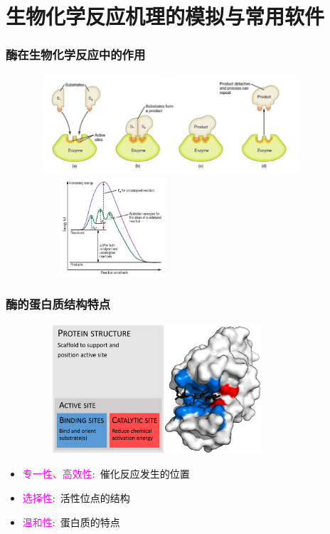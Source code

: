 \section{生物化学反应机理的模拟与常用软件}
\frame
{
	\frametitle{酶在生物化学反应中的作用}
\begin{figure}[h!]
\centering
\vspace{-5.5pt}
\includegraphics[height=1.45in,width=4.00in,viewport=0 0 800 310,clip]{Figures/enzyme-substrate-2.jpeg}
\includegraphics[height=1.45in,width=2.30in,viewport=0 0 850 780,clip]{Figures/Reaction-with-catalyst.jpg}
\label{Bio-Chem-enzy}
\end{figure}
}

\frame
{
	\frametitle{酶的蛋白质结构特点}
\begin{figure}[h!]
\centering
\vspace{-10.5pt}
\includegraphics[height=1.90in,width=3.60in,viewport=0 0 1950 1200,clip]{Figures/Enzyme_structure.png}
\label{enzyem_Structure}
\end{figure}
\begin{itemize}
	\item \textcolor{magenta}{专一性、高效性}:~催化反应发生的位置
	\item \textcolor{magenta}{选择性}:~活性位点的结构
	\item \textcolor{magenta}{温和性}:~蛋白质的特点
\end{itemize}
}

